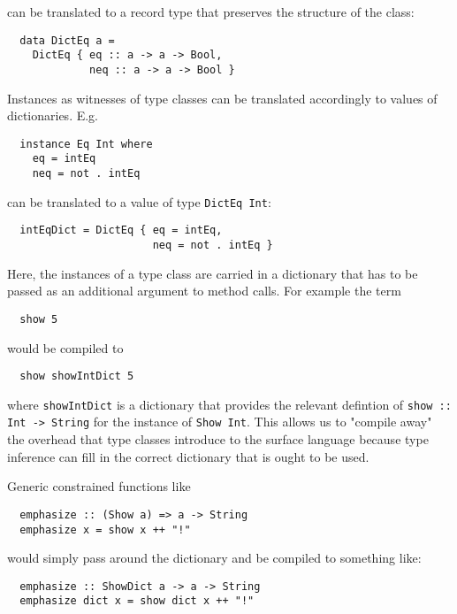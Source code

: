 can be translated to a record type that preserves the structure of the class:

\begin{verbatim}
  data DictEq a =
    DictEq { eq :: a -> a -> Bool,
             neq :: a -> a -> Bool }
\end{verbatim}

Instances as witnesses of type classes can be translated accordingly to values of dictionaries.
E.g.

\begin{verbatim}
  instance Eq Int where
    eq = intEq
    neq = not . intEq  
\end{verbatim}

can be translated to a value of type \texttt{DictEq Int}:

\begin{verbatim}
  intEqDict = DictEq { eq = intEq,
                       neq = not . intEq }
\end{verbatim}

Here, the instances of a type class are carried in a dictionary that has to be passed as an additional argument to method calls.
For example the term

\begin{verbatim}
  show 5
\end{verbatim}

would be compiled to

\begin{verbatim}
  show showIntDict 5
\end{verbatim}

where \texttt{showIntDict} is a dictionary that provides the relevant defintion of \texttt{show :: Int -> String} for the instance of \texttt{Show Int}.
This allows us to "compile away" the overhead that type classes introduce to the surface language because type inference can fill in the correct dictionary that is ought to be used.

Generic constrained functions like

\begin{verbatim}
  emphasize :: (Show a) => a -> String
  emphasize x = show x ++ "!"
\end{verbatim}

would simply pass around the dictionary and be compiled to something like:

\begin{verbatim}
  emphasize :: ShowDict a -> a -> String
  emphasize dict x = show dict x ++ "!"
\end{verbatim}

